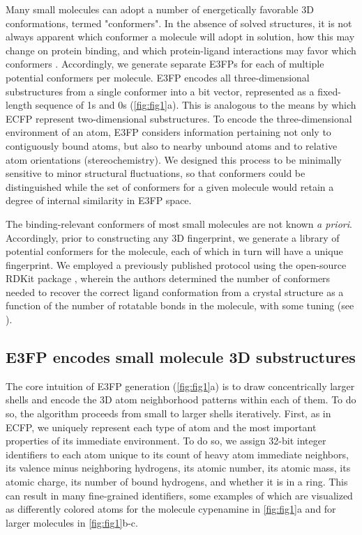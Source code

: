 \documentclass[../../main.tex]{subfiles}
\begin{document}
\begin{refsection}
	Many small molecules can adopt a number of energetically favorable 3D conformations, termed "conformers".
	In the absence of solved structures, it is not always apparent which conformer a molecule will adopt in solution, how this may change on protein binding, and which protein-ligand interactions may favor which conformers  \supercite{barelier_2015}.
	Accordingly, we generate separate E3FPs for each of multiple potential conformers per molecule.
	E3FP encodes all three-dimensional substructures from a single conformer into a bit vector, represented as a fixed-length sequence of 1s and 0s (\cref{fig:fig1}a).
	This is analogous to the means by which ECFP represent two-dimensional substructures.
	To encode the three-dimensional environment of an atom, E3FP considers information pertaining not only to contiguously bound atoms, but also to nearby unbound atoms and to relative atom orientations (stereochemistry).
	We designed this process to be minimally sensitive to minor structural fluctuations, so that conformers could be distinguished while the set of conformers for a given molecule would retain a degree of internal similarity in E3FP space.

	The binding-relevant conformers of most small molecules are not known \emph{a priori}.
	Accordingly, prior to constructing any 3D fingerprint, we generate a library of potential conformers for the molecule, each of which in turn will have a unique fingerprint.
	We employed a previously published protocol using the open-source RDKit package  \supercite{ebejer_2012}, wherein the authors determined the number of conformers needed to recover the correct ligand conformation from a crystal structure as a function of the number of rotatable bonds in the molecule, with some tuning (see ).

	\subsection*{E3FP encodes small molecule 3D substructures}

	The core intuition of E3FP generation (\cref{fig:fig1}a) is to draw concentrically larger shells and encode the 3D atom neighborhood patterns within each of them.
	To do so, the algorithm proceeds from small to larger shells iteratively.
	First, as in ECFP, we uniquely represent each type of atom and the most important properties of its immediate environment.
	To do so, we assign 32-bit integer identifiers to each atom unique to its count of heavy atom immediate neighbors, its valence minus neighboring hydrogens, its atomic number, its atomic mass, its atomic charge, its number of bound hydrogens, and whether it is in a ring.
	This can result in many fine-grained identifiers, some examples of which are visualized as differently colored atoms for the molecule cypenamine in \cref{fig:fig1}a and for larger molecules in \cref{fig:fig1}b-c.


\end{refsection}
\end{document}
